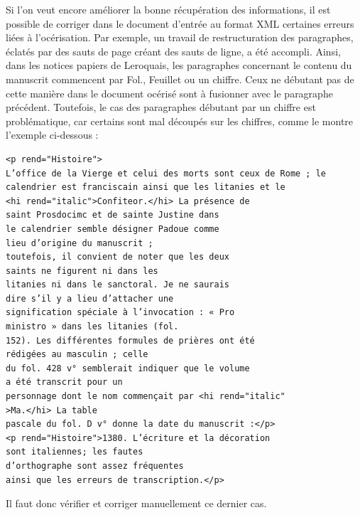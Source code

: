 \documentclass[a4paper,12pt,twoside]{book}
\begin{document}
	Si l'on veut encore améliorer la bonne récupération des informations, il est possible de corriger dans le document d'entrée au format XML certaines erreurs liées à l'océrisation. Par exemple, un travail de restructuration des paragraphes, éclatés par des sauts de page créant des sauts de ligne, a été accompli. Ainsi, dans les notices papiers de Leroquais, les paragraphes concernant le contenu du manuscrit commencent par \og Fol.\fg{}, \og Feuillet\fg{} ou un chiffre. Ceux ne débutant pas de cette manière dans le document océrisé sont à fusionner avec le paragraphe précédent. Toutefois, le cas des paragraphes débutant par un chiffre est problématique, car certains sont mal découpés sur les chiffres, comme le montre l'exemple ci-dessous : 
	\begin{verbatim}
<p rend="Histoire">
L’office de la Vierge et celui des morts sont ceux de Rome ; le
calendrier est franciscain ainsi que les litanies et le 
<hi rend="italic">Confiteor.</hi> La présence de 
saint Prosdocimc et de sainte Justine dans
le calendrier semble désigner Padoue comme 
lieu d’origine du manuscrit ;
toutefois, il convient de noter que les deux 
saints ne figurent ni dans les
litanies ni dans le sanctoral. Je ne saurais 
dire s’il y a lieu d’attacher une
signification spéciale à l’invocation : « Pro 
ministro » dans les litanies (fol.
152). Les différentes formules de prières ont été 
rédigées au masculin ; celle
du fol. 428 v° semblerait indiquer que le volume 
a été transcrit pour un
personnage dont le nom commençait par <hi rend="italic"
>Ma.</hi> La table
pascale du fol. D v° donne la date du manuscrit :</p>
<p rend="Histoire">1380. L’écriture et la décoration 
sont italiennes; les fautes
d’orthographe sont assez fréquentes
ainsi que les erreurs de transcription.</p>
	\end{verbatim}
	Il faut donc vérifier et corriger manuellement ce dernier cas. 
	
\end{document}

